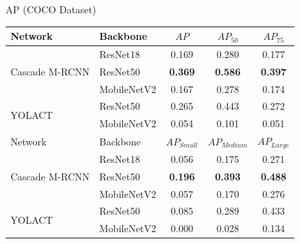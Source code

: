 \documentclass[18pt]{beamer}
\begin{document}
\begin{frame}{AP (COCO Dataset)}
\begin{table}[H]
	\centering
	\begin{tabular}{ll | ccc}
		\toprule
		Network                         & Backbone      & $AP$              & $AP_{50}$         & $AP_{75}$ \\
		\midrule
		\multirow{3}{*}{Cascade M-RCNN} & ResNet18      &  0.169 &  0.280 &  0.177 \\
		\multirow{1}{*}{}               & ResNet50      &  \textbf{0.369} &  \textbf{0.586} &  \textbf{0.397} \\
		\multirow{1}{*}{}               & MobileNetV2   &  0.167 &  0.278 &  0.174 \\
		\cline{3-5}
		\multirow{2}{*}{YOLACT}         & ResNet50      &  0.265 &  0.443 &  0.272 \\
		\multirow{1}{*}{}               & MobileNetV2   &  0.054 &  0.101 &  0.051 \\
		\midrule
		Network                         & Backbone      & $AP_{Small}$      & $AP_{Medium}$     & $AP_{Large}$ \\
		\midrule
		\multirow{3}{*}{Cascade M-RCNN} & ResNet18      &  0.056 	&      0.175 &     0.271 \\
		\multirow{1}{*}{}               & ResNet50      &  \textbf{0.196} 	&      \textbf{0.393} &     \textbf{0.488} \\
		\multirow{1}{*}{}               & MobileNetV2   &  0.057 	&      0.170 &     0.276 \\
		\cline{3-5}
		\multirow{2}{*}{YOLACT}         & ResNet50      &  0.085 	&      0.289 &     0.433 \\
		\multirow{1}{*}{}               & MobileNetV2   &  0.000 	&      0.028 &     0.134 \\
		\bottomrule
	\end{tabular}
\end{table}
\end{frame}
\end{document}
